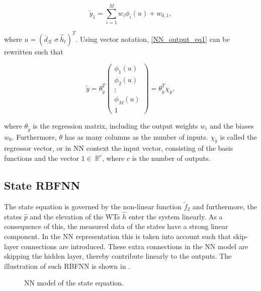   \begin{equation}
\label{NN_output_eq1}
\tilde{y}_1 = \sum_{i = 1}^M w_i \phi_i(u) +  w_{0,1},
\end{equation}

where $u = (\bar{d}_{\mathcal{K}} \ \sigma \ \hat{h}_t )^T$. Using vector notation, \eqref{NN_output_eq1} can be rewritten such that

  \begin{equation}
\label{NN_output_vector1}
\tilde{y} = \theta^T_{\tilde{y}} 
          \begin{pmatrix}
           \phi_1(u) \\[1pt]
           \phi_2(u) \\[1pt]
           \vdots \\[1pt]
           \phi_M(u)\\[3pt]
           1 
         \end{pmatrix}
         =
         \theta^T_{\tilde{y}} \chi_{\tilde{y}},
\end{equation}

where $\theta_{\tilde{y}}$ is the regression matrix, including the output weights $w_i$ and the biases $w_0$. Furthermore, $\theta$ has as many columns as the number of inputs. $\chi_{\tilde{y}}$ is called the regressor vector, or in NN context the input vector, consisting of the basis functions and the vector $1 \in \: \mathbb{R}^{c} $, where $c$ is the number of outputs. 

 \subsection{State RBFNN}
\label{state_rbfnn}

The state equation is governed by the non-linear function $\tilde{f}_2$ and furthermore, the states $\hat{p}$ and the elevation of the WTs $\hat{h}$ enter the system linearly. As a consequence of this, the measured data of the states have a strong linear component. In the NN representation this is taken into account such that skip-layer connections are introduced. These extra connections in the NN model are skipping the hidden layer, thereby contribute linearly to the outputs. The illustration of such RBFNN is shown in .

 \begin{figure}[H]
 \centering
  
 \caption{NN model of the state equation.}
 \label{fig:nn_state}
 \end{figure}

